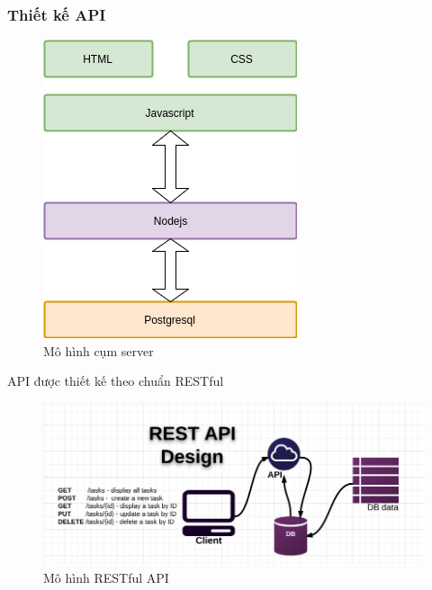 \documentclass[a4paper,12pt,oneside]{article}
\begin{document}
\subsubsection{Thiết kế API}
\begin{center}
\begin{figure}[htp]
\begin{center}
\includegraphics[scale=.9]{hinh/server.png}
\end{center}
\caption{Mô hình cụm server}
\label{refhinh1}
\end{figure}
\end{center}

\noindent API được thiết kế theo chuẩn RESTful
\begin{center}
\begin{figure}[htp]
\begin{center}
\includegraphics[scale=.5]{hinh/RESTful-API-design.jpg}
\end{center}
\caption{Mô hình RESTful API}
\label{refhinh1}
\end{figure}
\end{center}
\end{document}
